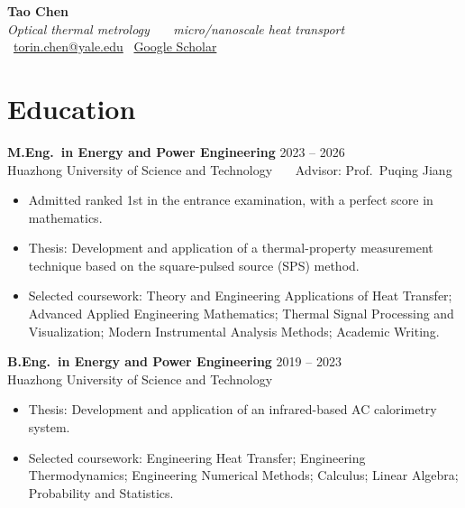 \documentclass[10pt,a4paper]{article}
\begin{document}
\begin{center}
  {\huge\bfseries Tao Chen}\\[0.3em]
  {\itshape\small Optical thermal metrology \ \textperiodcentered\ \ micro/nanoscale heat transport}\\[0.55em]
  \faEnvelope\ \href{mailto:torin.chen@yale.edu}{torin.chen@yale.edu}
  \quad\textbullet\quad
  \faGraduationCap\ \href{https://scholar.google.com/citations?user=wLh8cHgAAAAJ&hl=en}{Google Scholar}
\end{center}

\section{Education}

\textbf{M.Eng.\ in Energy and Power Engineering} \hfill 2023 -- 2026\\
Huazhong University of Science and Technology \ \textbar\ \ Advisor: Prof.\ Puqing Jiang
\begin{itemize}
  \item Admitted ranked 1st in the entrance examination, with a perfect score in mathematics.
  \item Thesis: Development and application of a thermal-property measurement technique based on the square-pulsed source (SPS) method.
  \item Selected coursework: Theory and Engineering Applications of Heat Transfer; Advanced Applied Engineering Mathematics; Thermal Signal Processing and Visualization; Modern Instrumental Analysis Methods; Academic Writing.
\end{itemize}

\vspace{2pt}
\textbf{B.Eng.\ in Energy and Power Engineering} \hfill 2019 -- 2023\\
Huazhong University of Science and Technology
\begin{itemize}
  \item Thesis: Development and application of an infrared-based AC calorimetry system.
  \item Selected coursework: Engineering Heat Transfer; Engineering Thermodynamics; Engineering Numerical Methods; Calculus; Linear Algebra; Probability and Statistics.
\end{itemize}

\end{document}
